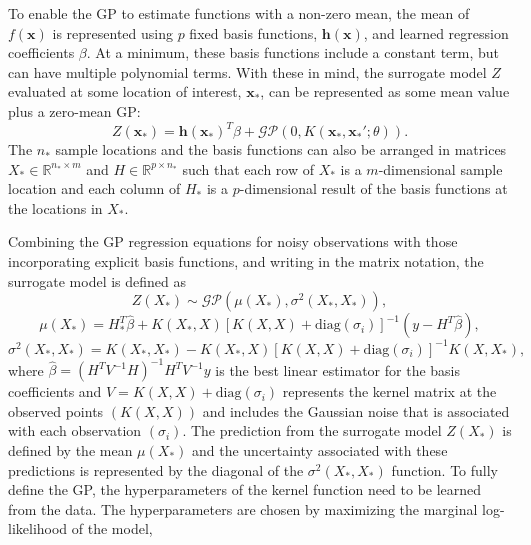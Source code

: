 To enable the GP to estimate functions with a non-zero mean, the mean of $f(\mathbf{x})$ is represented using $p$ fixed basis functions, $\mathbf{h(x)}$, and learned regression coefficients $\beta$. At a minimum, these basis functions include a constant term, but can have multiple polynomial terms. With these in mind, the surrogate model $Z$ evaluated at some location of interest, $\mathbf{x}_*$, can be represented as some mean value plus a zero-mean GP: 
\begin{equation}
    Z(\mathbf{x}_*) = \mathbf{h(\mathbf{x}_*)}^T\beta + \mathcal{GP}(0,K(\mathbf{x}_*,\mathbf{x}_*';\theta)).
\end{equation}
The $n_*$ sample locations and the basis functions can also be arranged in matrices $X_* \in \mathbb{R} ^{ n_* \times m}$ and $H \in \mathbb{R} ^{ p \times n_*}$ such that each row of $X_*$ is a $m$-dimensional sample location and each column of $H_*$ is a $p$-dimensional result of the basis functions at the locations in $X_*$.

Combining the GP regression equations for noisy observations with those incorporating explicit basis functions, and writing in the matrix notation, the surrogate model is defined as 
\begin{equation}
    Z(X_*) \sim \mathcal{GP} (\mu(X_*), \sigma^2(X_*,X_*)),
\end{equation}
\begin{equation} \label{equ:mu_gpr}
    \mu(X_*) = H_*^T\hat{\beta} + K(X_*,X)[K(X,X)+\text{diag}(\sigma_i)]^{-1} (y-H^T\hat{\beta}), 
\end{equation}
\begin{equation} \label{equ:sig_gpr}
    \sigma^2(X_*,X_*) = K(X_*,X_*) - K(X_*,X)[K(X,X)+\text{diag}(\sigma_i)]^{-1} K(X,X_*), 
\end{equation}
where $\hat{\beta} = (H^TV^{-1}H)^{-1}H^TV^{-1}y$ is the best linear estimator for the basis coefficients and $V = K(X,X) + \text{diag}(\sigma_i)$ represents the kernel matrix at the observed points $\left ( K(X,X) \right )$ and includes the Gaussian noise that is associated with each observation $\left ( \sigma_i \right )$. The prediction from the surrogate model $Z(X_*)$ is defined by the mean $\mu(X_*)$ and the uncertainty associated with these predictions is represented by the diagonal of the $\sigma^2(X_*,X_*)$ function. To fully define the GP, the hyperparameters of the kernel function need to be learned from the data. The hyperparameters are chosen by maximizing the marginal log-likelihood of the model, 

